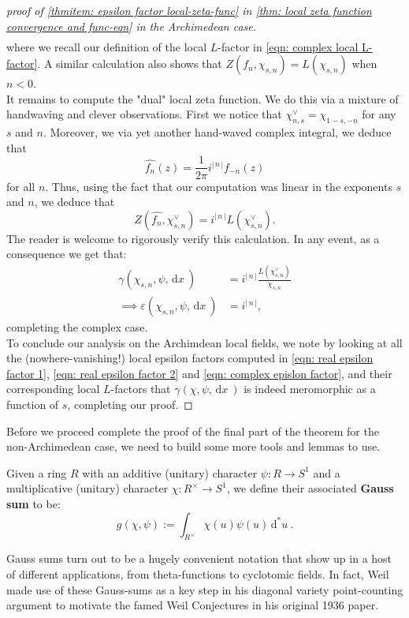 \documentclass[11pt, x11names]{book}
\newcommand{\abs}[1]{\left| \, #1  \,\right|}
\renewcommand{\hat}{\widehat}
\newcommand{\dx}{\, \mathrm{d}x \ }
\renewcommand{\d}[1]{\, \mathrm{d}#1 \ }
\begin{document}
\begin{proof}[proof of \ref{thmitem: epsilon factor local-zeta-func} in \ref{thm: local zeta function convergence and func-eqn} in the Archimedean case]
\begin{align*}
\end{align*}
where we recall our definition of the local $L$-factor in \ref{eqn: complex local L-factor}. A similar calculation also shows that $Z(f_n, \chi_{s, n}) = L(\chi_{s, n})$ when $n < 0$.\\
It remains to compute the "dual" local zeta function. We do this via a mixture of handwaving and clever observations. First we notice that $\chi^\lor_{n, s} = \chi_{1-s, -n}$ for any $s$ and $n$. Moreover, we via yet another hand-waved complex integral, we deduce that
\begin{equation*}
    \hat{f_n}(z) = \frac{1}{2\pi} i^{\abs{n}}f_{-n}(z)
\end{equation*}
for all $n$. Thus, using the fact that our computation was linear in the exponents $s$ and $n$, we deduce that
\begin{equation*}
    Z(\hat{f_n}, \chi^\lor_{s, n})  = i^{\abs{n}}L(\chi^\lor_{s, n}).
\end{equation*}
The reader is welcome to rigorously verify this calculation. In any event, as a consequence we get that:
\begin{align*}
    \label{eqn: complex epislon factor}
    \gamma(\chi_{s, n}, \psi, \dx) &= i^{\abs{n}} \frac{L(\chi^\lor_{s, n})}{\chi_{s, n}}\\
    \implies  \varepsilon(\chi_{s, n}, \psi, \dx) &= i^{\abs{n}},
\end{align*}
completing the complex case.\\

To conclude our analysis on the Archimdean local fields, we note by looking at all the (nowhere-vanishing!) local epsilon factors computed in \ref{eqn: real epsilon factor 1}, \ref{eqn: real epsilon factor 2} and \ref{eqn: complex epislon factor}, and their corresponding local $L$-factors that $\gamma(\chi, \psi, \dx)$ is indeed meromorphic as a function of $s$, completing our proof.
\end{proof}

Before we proceed complete the proof of the final part of the theorem for the non-Archimedean case, we need to build some more tools and lemmas to use.
\begin{defn}
    \label{def: Gauss sum}
    Given a ring $R$ with an additive (unitary) character $\psi: R \to S^1$ and a multiplicative (unitary) character $\chi: R^\times \to S^1$, we define their associated \textbf{Gauss sum} to be:
    \begin{equation*}
        g(\chi, \psi) := \int_{R^\times} \chi(u) \psi(u) \d{^*u}.
    \end{equation*}
    \end{defn}
    \begin{remark}
        Gauss sums turn out to be a hugely convenient notation that show up in a host of different applications, from theta-functions to cyclotomic fields. In fact, Weil made use of these Gauss-sums as a key step in his diagonal variety point-counting argument to motivate the famed Weil Conjectures in his original 1936 paper.
    \end{remark}
\end{document}
